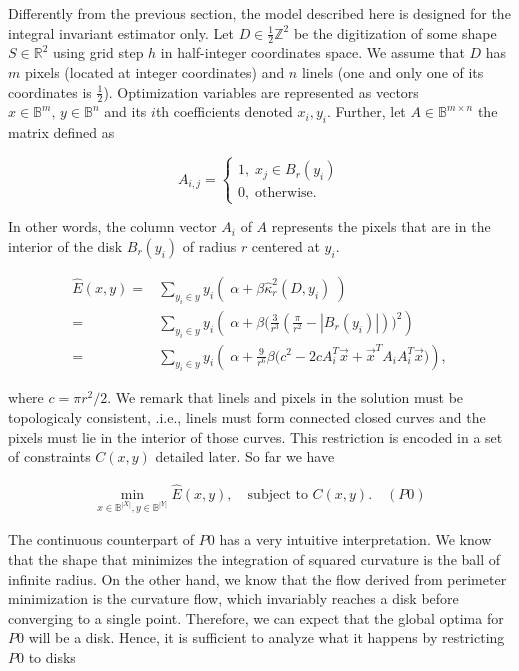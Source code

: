 Differently from the previous section, the model described here is designed for the integral invariant estimator only. Let $D \in \frac{1}{2}\mathbb{Z}^2$ be the digitization of some shape $S \in \mathbb{R}^2$ using grid step $h$ in half-integer coordinates space. We assume that $D$ has $m$ pixels (located at integer coordinates) and $n$ linels (one and only one of its coordinates is $\frac{1}{2}$). Optimization variables are represented as vectors $x \in \mathbb{B}^{m},\, y \in \mathbb{B}^{n}$ and its $i$th coefficients denoted  $x_i,y_i$.  Further, let $A \in \mathbb{B}^{m\times n}$ the matrix defined as

\[
	A_{i,j} = \left\{ \begin{array}{ll}
		1,\; x_j \in B_{r}(y_i)\\
		0,\; \text{otherwise}.
	\end{array}\right.
\]

In other words, the column vector $A_i$ of $A$ represents the pixels that are in the interior of  the disk $B_{r}(y_i)$ of radius $r$ centered at $y_i$. 


\begin{align}
	\hat{E}(x,y) =& \sum_{y_i \in y}{ y_i \left(\; \alpha + \beta \hat{\kappa}_{r}^2(D,y_i) \; \right)}\\\nonumber
			   =& \sum_{y_i \in y}{ y_i \left(\; \alpha  + \beta \big( \frac{3}{r^3}(\frac{\pi}{r^2} - |B_r(y_i)|)\big)^2\right)}\\\nonumber
			   =& \sum_{y_i \in y}{ y_i \left(\; \alpha + \frac{9}{r^6}\beta \big(c^2 - 2cA_i^T\vec{x} + \vec{x}^TA_iA_i^T\vec{x}\big)\right)},			   
	\end{align}
	
where $c =  \pi r^2/2$. We remark that linels and pixels in the solution must be topologicaly consistent, .i.e., linels must form connected closed curves and the pixels must lie in the interior of those curves. This restriction is encoded in a set of constraints $C(x,y)$ detailed later. So far we have

\begin{align*}
	\min_{x \in \mathbb{B}^{|X|}, y \in \mathbb{B}^{|Y|}}{\hat{E}(x,y)}, \quad \text{subject to } C(x,y). \quad (P0)
\end{align*}

The continuous counterpart of $P0$ has a very intuitive interpretation. We know that the shape that minimizes the integration of squared curvature is the ball of infinite radius. On the other hand, we know that the flow derived from perimeter minimization is the curvature flow, which invariably reaches a disk before converging to a single point. Therefore, we can expect that the global optima for $P0$ will be a disk. Hence, it is sufficient to analyze what it happens by restricting $P0$ to disks

